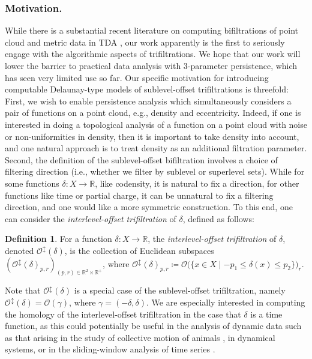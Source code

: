 \documentclass[11pt]{amsart}
\newcommand{\R}{\mathbb{R}} %
\newcommand{\deff}{\emph}
\newcommand{\Offset}[0]{\mathcal{O}}
\renewcommand{\subparagraph}[1]{\subsubsection*{\textbf{\textup{#1}}}}
\theoremstyle{plain}
\theoremstyle{definition}
\newtheorem{definition}[theorem]{Definition}
\theoremstyle{remark}
\begin{document}
%
\subparagraph{Motivation.}
While there is a substantial recent literature on computing bifiltrations of point cloud and metric data in TDA \cite{corbet2023computing,alonsoDelaunayBifiltrationsFunctions2024,blaser2024core,lesnick2024nerve, alonso2024sparse,alonso2023filtration}, our work apparently is the first to seriously engage with the algorithmic aspects of trifiltrations.  We hope that our work will lower the barrier to practical data analysis with 3-parameter persistence, which has seen very limited use so far.  
%
Our specific motivation for introducing computable Delaunay-type models of sublevel-offset trifiltrations is threefold:  First, we wish to enable persistence analysis which simultaneously considers a pair of functions on a point cloud, e.g., density and eccentricity.  
Indeed, if one is interested in doing a topological analysis of a function on a point cloud with noise or non-uniformities in density, then it is important to take density into account, and one natural approach is to treat density as an additional filtration parameter.
%
Second, the definition of the sublevel-offset bifiltration involves a choice of filtering direction (i.e., whether we filter by sublevel or superlevel sets). While for some functions $\delta\colon X\to \R$, like codensity, it is natural to fix a direction, for other functions like time or partial charge, it can be unnatural to fix a filtering direction, and one would like a more symmetric construction. To this end, one can consider the \emph{interlevel-offset trifiltration} of $\delta$, defined as follows:
\begin{definition}
For a function $\delta: X \to \R$, the \deff{interlevel-offset trifiltration}
of $\delta$, denoted $\Offset^{\updownarrow}(\delta)$, is the collection of Euclidean subspaces
$
(\Offset^{\updownarrow}(\delta)_{p, r})_{(p, r) \in \R^2 \times \R^+}$, where $\Offset^{\updownarrow}(\delta)_{p, r} \coloneqq \Offset\bigl(\{x \in X \mid  -p_1 \leq \delta(x) \leq p_2\}\bigr)_r$.%
%
\end{definition}
Note that $\Offset^{\updownarrow}(\delta)$ is a special case of the sublevel-offset trifiltration, namely $\Offset^{\updownarrow}(\delta)=\Offset(\gamma)$, where $\gamma=(-\delta,\delta)$. We are especially interested in computing the homology of the interlevel-offset trifiltration in the case that $\delta$ is a time function, as this could potentially be useful in the analysis of dynamic data such as that arising in the study of collective motion of animals \cite{adams2020topological}, in dynamical systems, or in the sliding-window analysis of time series \cite{perea2015sliding}.
\end{document}
